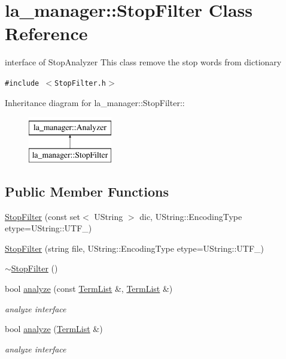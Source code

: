 \hypertarget{classla__manager_1_1StopFilter}{
\section{la\_\-manager::StopFilter Class Reference}
\label{classla__manager_1_1StopFilter}
}
interface of StopAnalyzer This class remove the stop words from dictionary  


{\tt \#include $<$StopFilter.h$>$}

Inheritance diagram for la\_\-manager::StopFilter::\begin{figure}[H]
\begin{center}
\leavevmode
\includegraphics[height=2cm]{classla__manager_1_1StopFilter}
\end{center}
\end{figure}
\subsection*{Public Member Functions}
\begin{CompactItemize}
\item 
\hyperlink{classla__manager_1_1StopFilter_72e0644364e3a8ab8dc7d43748ee8303}{StopFilter} (const set$<$ UString $>$ dic, UString::EncodingType etype=UString::UTF\_)
\item 
\hyperlink{classla__manager_1_1StopFilter_31faf375353246498973fbf51e0c3bdc}{StopFilter} (string file, UString::EncodingType etype=UString::UTF\_)
\item 
\hyperlink{classla__manager_1_1StopFilter_db5d462aacd49faefbdcf1ec28aacd67}{$\sim$StopFilter} ()
\item 
bool \hyperlink{classla__manager_1_1StopFilter_455c6f7e8330c3684ffd548956fe7a16}{analyze} (const \hyperlink{namespacela__manager_06c0aab93982ee3ebc3ef9d0419e619a}{TermList} \&, \hyperlink{namespacela__manager_06c0aab93982ee3ebc3ef9d0419e619a}{TermList} \&)
\begin{CompactList}\small\item\em analyze interface \item\end{CompactList}\item 
bool \hyperlink{classla__manager_1_1StopFilter_17b962063274fdae433e111a39d80f22}{analyze} (\hyperlink{namespacela__manager_06c0aab93982ee3ebc3ef9d0419e619a}{TermList} \&)
\begin{CompactList}\small\item\em analyze interface \item\end{CompactList}\end{CompactItemize}
